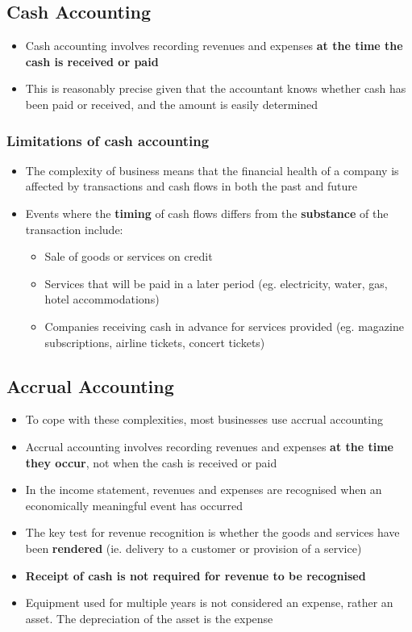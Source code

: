 \documentclass{article}
\begin{document}
	\subsection{Cash Accounting}
		\begin{itemize}
			\item Cash accounting involves recording revenues and expenses \textbf{at the time the cash is received or paid}
			\item This is reasonably precise given that the accountant knows whether cash has been paid or received, and the amount is easily determined
		\end{itemize}

		\subsubsection{Limitations of cash accounting}
			\begin{itemize}
				\item The complexity of business means that the financial health of a company is affected by transactions and cash flows in both the past and future
				\item Events where the \textbf{timing} of cash flows differs from the \textbf{substance} of the transaction include:
					\begin{itemize}
						\item Sale of goods or services on credit
						\item Services that will be paid in a later period (eg. electricity, water, gas, hotel accommodations)
						\item Companies receiving cash in advance for services provided (eg. magazine subscriptions, airline tickets, concert tickets)
					\end{itemize}
			\end{itemize}

	\subsection{Accrual Accounting}
		\begin{itemize}
			\item To cope with these complexities, most businesses use accrual accounting
			\item Accrual accounting involves recording revenues and expenses \textbf{at the time they occur}, not when the cash is received or paid
			\item In the income statement, revenues and expenses are recognised when an economically meaningful event has occurred
			\item The \colorbox{pastel_green}{key test for revenue recognition is whether the goods and services have been \textbf{rendered}} (ie. delivery to a customer or provision of a service)
			\item \textbf{Receipt of cash is not required for revenue to be recognised}
			\item Equipment used for multiple years is not considered an expense, rather an asset. The depreciation of the asset is the expense
		\end{itemize}
\end{document}
